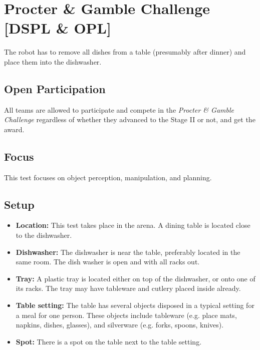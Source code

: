 \section{Procter \& Gamble Challenge [DSPL \& OPL]}

%
%
\newcommand{\TidePod}{%
	\textit{%
		\fontfamily{pvh}\selectfont%
		P\&G
		\fontfamily{phv}\selectfont%
		\textcolor{tpblue}{Tide}%
		\textcolor{tporange}{\textbf{\upshape POD}}%
	}%
}
\newcommand{\openpart}{%
All teams are allowed to participate and compete in the \textit{Procter \& Gamble Challenge} regardless of whether they advanced to the Stage II or not, and get the award.
}

The robot has to remove all dishes from a table (presumably after dinner) and place them into the dishwasher.

\subsection{Open Participation}
\openpart

\subsection{Focus}
This test focuses on object perception, manipulation, and planning.

\subsection{Setup}
\begin{itemize}
	\item \textbf{Location:} This test takes place in the arena. A dining table is located close to the dishwasher.
	\item \textbf{Dishwasher:} The dishwasher is near the table, preferably located in the same room. The dish washer is open and with all racks out.
	\item \textbf{Tray:} A plastic tray is located either on top of the dishwasher, or onto one of its racks. The tray may have tableware and cutlery placed inside already.
	\item \textbf{Table setting:} The table has several objects disposed in a typical setting for a meal for one person. These objects include tableware (e.g. place mats, napkins, dishes, glasses), and silverware (e.g. forks, spoons, knives).
	\item \textbf{Spot:} There is a spot on the table next to the table setting.
\end{itemize}

